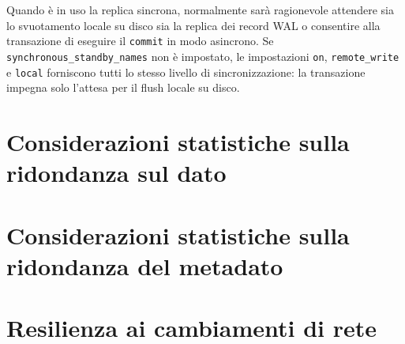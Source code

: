 Quando \`{e} in uso la replica sincrona, normalmente sar\`{a} ragionevole attendere sia lo svuotamento locale su disco sia la replica dei record WAL o consentire alla transazione di eseguire il \verb"commit" in modo asincrono. Se \verb"synchronous_standby_names" non \`{e} impostato, le impostazioni \verb"on", \verb"remote_write" e \verb"local" forniscono tutti lo stesso livello di sincronizzazione: la transazione impegna solo l'attesa per il flush locale su disco.



\section{Considerazioni statistiche sulla ridondanza sul dato}
\section{Considerazioni statistiche sulla ridondanza del metadato}
\section{Resilienza ai cambiamenti di rete}